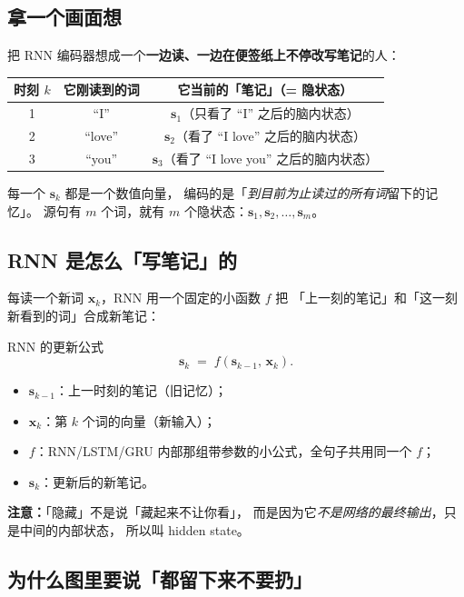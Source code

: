 \documentclass[11pt,a4paper]{ctexart}
\newcommand{\vect}[1]{\boldsymbol{#1}}
\begin{document}
\subsection{拿一个画面想}

把 RNN 编码器想成一个\textbf{一边读、一边在便签纸上不停改写笔记}的人：

\begin{center}
\renewcommand{\arraystretch}{1.25}
\begin{tabular}{@{}c c c@{}}
\toprule
时刻 $k$ & 它刚读到的词 & 它当前的「笔记」（= 隐状态） \\
\midrule
1 & ``I''    & $\vect{s}_1$（只看了 ``I'' 之后的脑内状态） \\
2 & ``love'' & $\vect{s}_2$（看了 ``I love'' 之后的脑内状态） \\
3 & ``you''  & $\vect{s}_3$（看了 ``I love you'' 之后的脑内状态） \\
\bottomrule
\end{tabular}
\end{center}

每一个 $\vect{s}_k$ 都是一个数值向量，
编码的是「\emph{到目前为止读过的所有词}留下的记忆」。
源句有 $m$ 个词，就有 $m$ 个隐状态：$\vect{s}_1, \vect{s}_2, \dots, \vect{s}_m$。

\subsection{RNN 是怎么「写笔记」的}

每读一个新词 $\vect{x}_k$，RNN 用一个固定的小函数 $f$ 把
「上一刻的笔记」和「这一刻新看到的词」合成新笔记：

\begin{mathbox}{RNN 的更新公式}
\[
  \vect{s}_k \;=\; f(\vect{s}_{k-1},\, \vect{x}_k).
\]
\begin{itemize}
  \item $\vect{s}_{k-1}$：上一时刻的笔记（旧记忆）；
  \item $\vect{x}_k$：第 $k$ 个词的向量（新输入）；
  \item $f$：RNN/LSTM/GRU 内部那组带参数的小公式，全句子共用同一个 $f$；
  \item $\vect{s}_k$：更新后的新笔记。
\end{itemize}
\end{mathbox}

\textbf{注意：}「隐藏」不是说「藏起来不让你看」，
而是因为它\emph{不是网络的最终输出}，只是中间的内部状态，
所以叫 hidden state。

\subsection{为什么图里要说「都留下来不要扔」}
\end{document}
